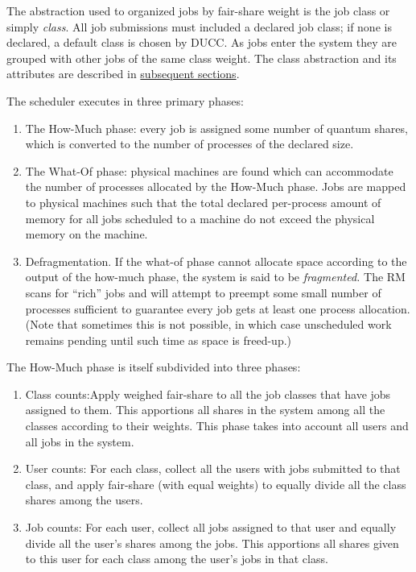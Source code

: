     The abstraction used to organized jobs by fair-share weight is the
    job class or simply {\em class}.  All job submissions must included a declared job class; if none
    is declared, a default class is chosen by DUCC.  As jobs enter the system they are
    grouped with other jobs of the same class weight. The class abstraction
    and its attributes are described in \hyperref[sec:rm.job-classes]{subsequent sections}.
    
    The scheduler executes in three primary phases: 
    \begin{enumerate}

        \item The How-Much phase: every job is assigned some number of
          quantum shares, which is converted to the number of
          processes of the declared size.

        \item The What-Of phase: physical machines are found which can
          accommodate the number of processes allocated by the
          How-Much phase. Jobs are mapped to physical machines such
          that the total declared per-process amount of memory for all
          jobs scheduled to a machine do not exceed the physical
          memory on the machine.

        \item Defragmentation. If the what-of phase cannot allocate
          space according to the output of the how-much phase, the
          system is said to be {\em fragmented.}  The RM scans for
          ``rich'' jobs and will attempt to preempt some small number
          of processes sufficient to guarantee every job gets at least
          one process allocation. (Note that sometimes this is not possible,
          in which case unscheduled work remains pending until such
          time as space is freed-up.)

    \end{enumerate}
      
    The How-Much phase is itself subdivided into three phases:
    \begin{enumerate}

        \item Class counts:Apply weighed fair-share to all the job classes that have jobs assigned to
          them. This apportions all shares in the system among all the classes according to their
          weights.  This phase takes into account all users and all jobs in the system.

        \item User counts: For each class, collect all the users with
          jobs submitted to that class, and apply fair-share (with
          equal weights) to equally divide all the class shares among
          the users.
          
        \item Job counts: For each user, collect all jobs
          assigned to that user and equally divide all the user's shares among
          the jobs. This apportions all shares given to this user for each class among the user's
          jobs in that class. 
    \end{enumerate}

